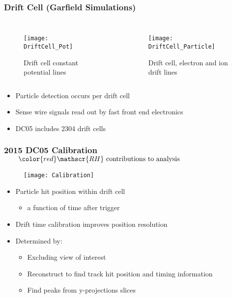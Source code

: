 \begin{frame}
  \frametitle{Drift Cell (Garfield Simulations)}
  \setlength\abovecaptionskip{-5pt}
  \begin{columns}
    \begin{figure}
      \vspace*{-0.4cm}
      \centering
      \texttt{[image: DriftCell\_Pot]}
      \caption{Drift cell constant potential lines}
    \end{figure}
    \begin{figure}
      \vspace*{-0.4cm}
      \centering
      \texttt{[image: DriftCell\_Particle]}
      \caption{Drift cell, electron and ion drift lines}
    \end{figure}
  \end{columns}
  \begin{itemize}
  \item Particle detection occurs per drift cell
  \item Sense wire signals read out by fast front end electronics
  \item DC05 includes 2304 drift cells
  \end{itemize}
\end{frame}


\begin{frame}%
  \frametitle{2015 DC05 Calibration $\qquad \color{red} \mathscr{RH} \text{ contributions to analysis}$}

  \begin{figure}
    \centering
    \texttt{[image: Calibration]}
  \end{figure}
  
  \begin{itemize}
  \item Particle hit position within drift cell
    \begin{itemize}
    \item a function of time after trigger
    \end{itemize}
  \item Drift time calibration improves position resolution
  \item Determined by:
    \begin{itemize}
    \item Excluding view of interest
    \item Reconstruct to find track hit position and timing
      information
    \item Find peaks from y-projections slices
    \end{itemize}
  \end{itemize}
\end{frame}


